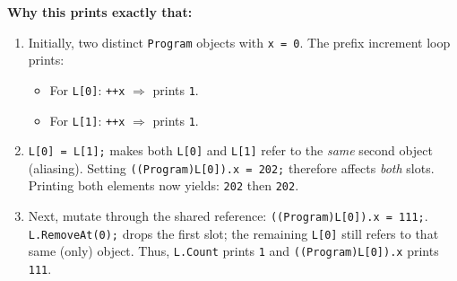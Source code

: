 \textbf{Why this prints exactly that:}
\begin{enumerate}
  \item Initially, two distinct \verb|Program| objects with \verb|x = 0|.
        The prefix increment loop prints:
        \begin{itemize}
          \item For \verb|L[0]|: \verb|++x| $\Rightarrow$ prints \verb|1|.
          \item For \verb|L[1]|: \verb|++x| $\Rightarrow$ prints \verb|1|.
        \end{itemize}
  \item \verb|L[0] = L[1];| makes both \verb|L[0]| and \verb|L[1]| refer to the \emph{same} second object (aliasing).  
        Setting \verb|((Program)L[0]).x = 202;| therefore affects \emph{both} slots. Printing both elements now yields:
        \verb|202| then \verb|202|.
  \item Next, mutate through the shared reference: \verb|((Program)L[0]).x = 111;|.  
        \verb|L.RemoveAt(0);| drops the first slot; the remaining \verb|L[0]| still refers to that same (only) object.  
        Thus, \verb|L.Count| prints \verb|1| and \verb|((Program)L[0]).x| prints \verb|111|.
\end{enumerate}




